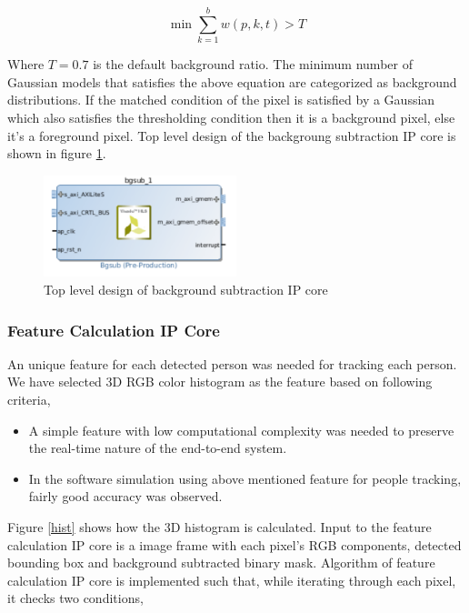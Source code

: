 \documentclass[12pt,a4paper]{report}
\begin{document}
\begin{equation}
\min \sum_{k=1}^{b} w(p,k,t)>T
\end{equation}

Where $T = 0.7$ is the default background ratio. The minimum number of Gaussian models that satisfies the above equation are categorized as background distributions. If the matched condition of the pixel is satisfied by a Gaussian which also satisfies the thresholding condition then it is a background pixel, else it$’$s a foreground pixel.
Top level design of the backgroung subtraction IP core is shown in figure \ref{gmmip}.

\begin{figure}[H]
\includegraphics[width=0.5\textwidth]{gmmip}
\centering
\caption{Top level design of background subtraction IP core}
\label{gmmip}
\end{figure}

\subsubsection{Feature Calculation IP Core}

An unique feature for each detected person was needed for tracking each person. We have selected 3D RGB color histogram as the feature based on following criteria,
\begin{itemize}
\item A simple feature with low computational complexity was needed to preserve the real-time nature of the end-to-end system.
\item In the software simulation using above mentioned feature for people tracking, fairly good accuracy was observed. 
\end{itemize}

Figure \ref{hist} shows how the 3D histogram is calculated. Input to the feature calculation IP core is a image frame with each pixel's RGB components, detected bounding box and background subtracted binary mask.
Algorithm of feature calculation IP core is implemented such that, while iterating through each pixel, it checks two conditions,
\end{document}
